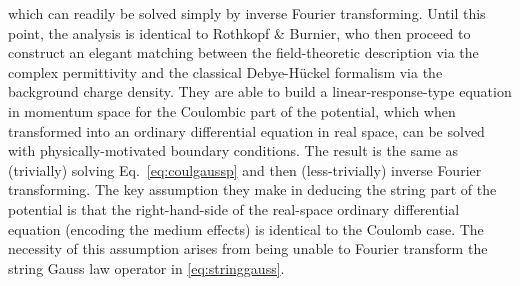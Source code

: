 \documentclass[12pt,a4paper]{article}
\begin{document}
which can readily be solved simply by inverse Fourier transforming. Until this point, the analysis is identical to Rothkopf \& Burnier, who then proceed to construct an elegant matching between the field-theoretic description via the complex permittivity and the classical Debye-H{\"u}ckel formalism via the background charge density. They are able to build a linear-response-type equation in momentum space for the Coulombic part of the potential, which when transformed into an ordinary differential equation in real space, can be solved with physically-motivated boundary conditions. The result is the same as (trivially) solving Eq.~\eqref{eq:coulgaussp} and then (less-trivially) inverse Fourier transforming. The key assumption they make in deducing the string part of the potential is that the right-hand-side of the real-space ordinary differential equation (encoding the medium effects) is identical to the Coulomb case. The necessity of this assumption arises from being unable to Fourier transform the string Gauss law operator in \eqref{eq:stringgauss}.
\end{document}
